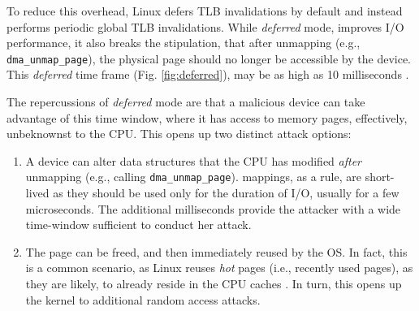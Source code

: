 To reduce this overhead, Linux defers TLB invalidations by default and instead performs periodic global TLB invalidations. While \emph{deferred} mode, improves I/O performance, it also breaks the stipulation, that after unmapping (e.g., \texttt{dma\_unmap\_page}), the physical page should no longer be accessible by the device. This \emph{deferred} time frame (Fig. \ref{fig:deferred}), may be as high as 10 milliseconds \cite{MSMT18}.

The repercussions of \emph{deferred} mode are that a malicious device can take advantage of this time window, where it has access to memory pages, effectively, unbeknownst to the CPU. This opens up two distinct attack options:

\begin{enumerate}
    \item A device can alter data structures that the CPU has modified \emph{after} unmapping (e.g., calling \texttt{dma\_unmap\_page}).
    \iova{} mappings, as a rule, are short-lived as they should be used only for the duration of I/O, usually for a few microseconds. The additional milliseconds provide the attacker with a wide time-window sufficient to conduct her attack.
    \item The page can be freed, and then immediately reused by the OS. In fact, this is a common scenario, as Linux reuses \emph{hot} pages (i.e., recently used pages), as they are likely, to already reside in the CPU caches \cite{hotcold}. In turn, this opens up the kernel to additional random access attacks.
\end{enumerate}

